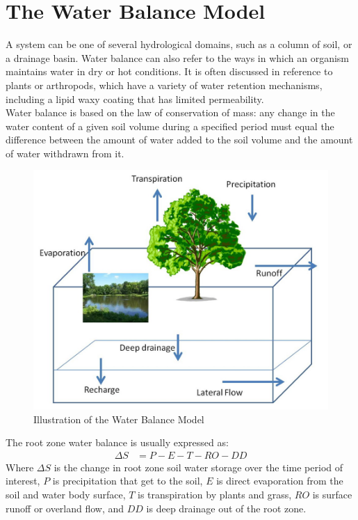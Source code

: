 \documentclass[12pt,journal,compsoc,onecolumn]{IEEEtran}
\begin{document}
\section{The Water Balance Model}
A system can be one of several hydrological domains, such as a column of soil, or a drainage basin. Water balance can also refer to the ways in which an organism maintains water in dry or hot conditions. It is often discussed in reference to plants or arthropods, which have a variety of water retention mechanisms, including a lipid waxy coating that has limited permeability.\\
\newline
Water balance is based on the law of conservation of mass:
any change in the water content of a given soil volume during a specified period must equal the difference between the amount of water added to the soil volume and the amount of water withdrawn from it.
	\begin{figure}[H]
		\begin{center} 
		\includegraphics[width=12cm]{waterbalance.jpg}
		\caption{Illustration of the Water Balance Model}
		\label{fig:wbillustration}
		\end{center}
	\end{figure}
The root zone water balance is usually expressed as:
	\begin{align}
	\Delta S &= P - E-T-RO-DD
	\label{eq:wbequation}
	\end{align}
Where $\Delta S$ is the change in root zone soil water storage over the time period of interest, $P$ is precipitation that get to the soil, $E$ is direct evaporation from the soil and water body surface, $T$ is transpiration by plants and grass, $RO$ is surface runoff or overland flow, and $DD$ is deep drainage out of the root zone.\\
\end{document}
